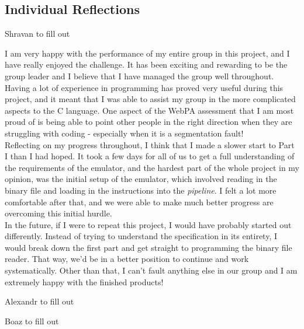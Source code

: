 \documentclass[11pt]{article}
\newenvironment{myquote}%
  {\list{}{\leftmargin=0.0in\rightmargin=0.0in}\item[]}%
  {\endlist}
\begin{document}
\subsection{Individual Reflections}

\begin{myquote}
Shravan to fill out
\end{myquote}


\begin{myquote}\noindent
I am very happy with the performance of my entire group in this project, and I have really enjoyed the challenge. It has been exciting and rewarding to be the group leader and I believe that I have managed the group well throughout. Having a lot of experience in programming has proved very useful during this project, and it meant that I was able to assist my group in the more complicated aspects to the C language. One aspect of the WebPA assessment that I am most proud of is being able to point other people in the right direction when they are struggling with coding - especially when it is a segmentation fault!
\\Reflecting on my progress throughout, I think that I made a slower start to Part I than I had hoped. It took a few days for all of us to get a full understanding of the requirements of the emulator, and the hardest part of the whole project in my opinion, was the initial setup of the emulator, which involved reading in the binary file and loading in the instructions into the \emph{pipeline}. I felt a lot more comfortable after that, and we were able to make much better progress are overcoming this initial hurdle.
\\In the future, if I were to repeat this project, I would have probably started out differently. Instead of trying to understand the  specification in its entirety, I would break down the first part and get straight to programming the binary file reader. That way, we'd be in a better position to continue and work systematically. Other than that, I can't fault anything else in our group and I am extremely happy with the finished products!
\end{myquote}


\begin{myquote}
Alexandr to fill out
\end{myquote}


\begin{myquote}
Boaz to fill out
\end{myquote}
\end{document}
